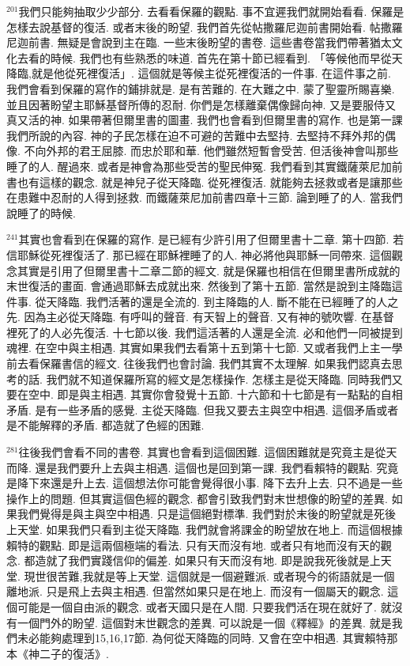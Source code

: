 \documentclass{book}
\begin{document}
$^{201}$我們只能夠抽取少少部分.
去看看保羅的觀點.
事不宜遲我們就開始看看.
保羅是怎樣去說基督的復活.
或者末後的盼望.
我們首先從帖撒羅尼迦前書開始看.
帖撒羅尼迦前書.
無疑是會說到主在臨.
一些末後盼望的書卷.
這些書卷當我們帶著猶太文化去看的時候.
我們也有些熟悉的味道.
首先在第十節已經看到.
「等候他而早從天降臨,就是他從死裡復活」.
這個就是等候主從死裡復活的一件事.
在這件事之前.
我們會看到保羅的寫作的鋪排就是.
是有苦難的.
在大難之中.
蒙了聖靈所賜喜樂.
並且因著盼望主耶穌基督所傳的忍耐.
你們是怎樣離棄偶像歸向神.
又是要服侍又真又活的神.
如果帶著但爾里書的圖畫.
我們也會看到但爾里書的寫作.
也是第一課我們所說的內容.
神的子民怎樣在迫不可避的苦難中去堅持.
去堅持不拜外邦的偶像.
不向外邦的君王屈膝.
而忠於耶和華.
他們雖然短暫會受苦.
但活後神會叫那些睡了的人.
醒過來.
或者是神會為那些受苦的聖民伸冤.
我們看到其實鐵薩萊尼加前書也有這樣的觀念.
就是神兒子從天降臨.
從死裡復活.
就能夠去拯救或者是讓那些在患難中忍耐的人得到拯救.
而鐵薩萊尼加前書四章十三節.
論到睡了的人.
當我們說睡了的時候.

$^{241}$其實也會看到在保羅的寫作.
是已經有少許引用了但爾里書十二章.
第十四節.
若信耶穌從死裡復活了.
那已經在耶穌裡睡了的人.
神必將他與耶穌一同帶來.
這個觀念其實是引用了但爾里書十二章二節的經文.
就是保羅也相信在但爾里書所成就的末世復活的畫面.
會通過耶穌去成就出來.
然後到了第十五節.
當然是說到主降臨這件事.
從天降臨.
我們活著的還是全流的.
到主降臨的人.
斷不能在已經睡了的人之先.
因為主必從天降臨.
有呼叫的聲音.
有天智上的聲音.
又有神的號吹響.
在基督裡死了的人必先復活.
十七節以後.
我們這活著的人還是全流.
必和他們一同被提到魂裡.
在空中與主相遇.
其實如果我們去看第十五到第十七節.
又或者我們上主一學前去看保羅書信的經文.
往後我們也會討論.
我們其實不太理解.
如果我們認真去思考的話.
我們就不知道保羅所寫的經文是怎樣操作.
怎樣主是從天降臨.
同時我們又要在空中.
即是與主相遇.
其實你會發覺十五節.
十六節和十七節是有一點點的自相矛盾.
是有一些矛盾的感覺.
主從天降臨.
但我又要去主與空中相遇.
這個矛盾或者是不能解釋的矛盾.
都造就了色經的困難.

$^{281}$往後我們會看不同的書卷.
其實也會看到這個困難.
這個困難就是究竟主是從天而降.
還是我們要升上去與主相遇.
這個也是回到第一課.
我們看賴特的觀點.
究竟是降下來還是升上去.
這個想法你可能會覺得很小事.
降下去升上去.
只不過是一些操作上的問題.
但其實這個色經的觀念.
都會引致我們對末世想像的盼望的差異.
如果我們覺得是與主與空中相遇.
只是這個絕對標準.
我們對於末後的盼望就是死後上天堂.
如果我們只看到主從天降臨.
我們就會將課金的盼望放在地上.
而這個根據賴特的觀點.
即是這兩個極端的看法.
只有天而沒有地.
或者只有地而沒有天的觀念.
都造就了我們實踐信仰的偏差.
如果只有天而沒有地.
即是說我死後就是上天堂.
現世很苦難,我就是等上天堂.
這個就是一個避難派.
或者現今的術語就是一個離地派.
只是飛上去與主相遇.
但當然如果只是在地上.
而沒有一個屬天的觀念.
這個可能是一個自由派的觀念.
或者天國只是在人間.
只要我們活在現在就好了.
就沒有一個門外的盼望.
這個對末世觀念的差異.
可以說是一個《釋經》的差異.
就是我們未必能夠處理到15,16,17節.
為何從天降臨的同時.
又會在空中相遇.
其實賴特那本《神二子的復活》.
\end{document}
